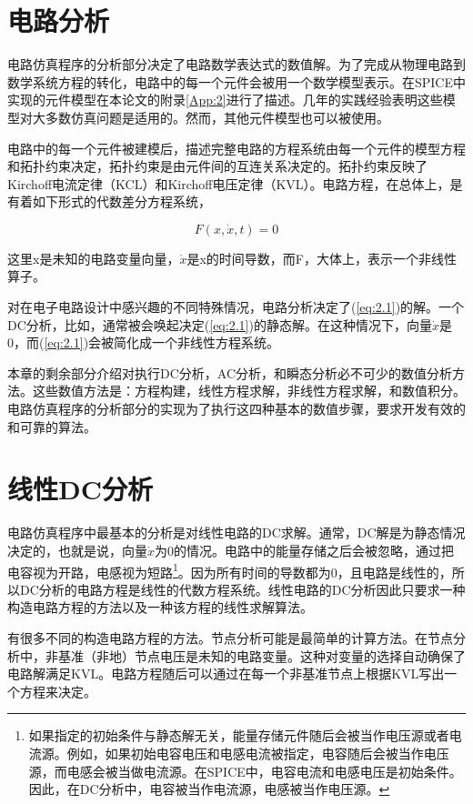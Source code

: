 \section{电路分析}
电路仿真程序的分析部分决定了电路数学表达式的数值解。为了完成从物理电路到数学系统方程的转化，电路中的每一个元件会被用一个数学模型表示。在SPICE中实现的元件模型在本论文的附录\ref{App:2}进行了描述。几年的实践经验表明这些模型对大多数仿真问题是适用的。然而，其他元件模型也可以被使用。

电路中的每一个元件被建模后，描述完整电路的方程系统由每一个元件的模型方程和拓扑约束决定，拓扑约束是由元件间的互连关系决定的。拓扑约束反映了Kirchoff电流定律（KCL）和Kirchoff电压定律（KVL）。电路方程，在总体上，是有着如下形式的代数差分方程系统，

\begin{equation}
    F(x,\dot{x},t)=0
    \label{eq:2.1}
\end{equation}

这里x是未知的电路变量向量，$\dot{x}$是x的时间导数，而F，大体上，表示一个非线性算子。

对在电子电路设计中感兴趣的不同特殊情况，电路分析决定了(\ref{eq:2.1})的解。一个DC分析，比如，通常被会唤起决定(\ref{eq:2.1})的静态解。在这种情况下，向量$\dot{x}$是0，而(\ref{eq:2.1})会被简化成一个非线性方程系统。

本章的剩余部分介绍对执行DC分析，AC分析，和瞬态分析必不可少的数值分析方法。这些数值方法是：方程构建，线性方程求解，非线性方程求解，和数值积分。电路仿真程序的分析部分的实现为了执行这四种基本的数值步骤，要求开发有效的和可靠的算法。

\section{线性DC分析}
电路仿真程序中最基本的分析是对线性电路的DC求解。通常，DC解是为静态情况决定的，也就是说，向量$\dot{x}$为0的情况。电路中的能量存储之后会被忽略，通过把电容视为开路，电感视为短路\footnote{如果指定的初始条件与静态解无关，能量存储元件随后会被当作电压源或者电流源。例如，如果初始电容电压和电感电流被指定，电容随后会被当作电压源，而电感会被当做电流源。在SPICE中，电容电流和电感电压是初始条件。因此，在DC分析中，电容被当作电流源，电感被当作电压源。}。因为所有时间的导数都为0，且电路是线性的，所以DC分析的电路方程是线性的代数方程系统。线性电路的DC分析因此只要求一种构造电路方程的方法以及一种该方程的线性求解算法。

有很多不同的构造电路方程的方法。节点分析\cite{ref-7}可能是最简单的计算方法。在节点分析中，非基准（非地）节点电压是未知的电路变量。这种对变量的选择自动确保了电路解满足KVL。电路方程随后可以通过在每一个非基准节点上根据KVL写出一个方程来决定。

